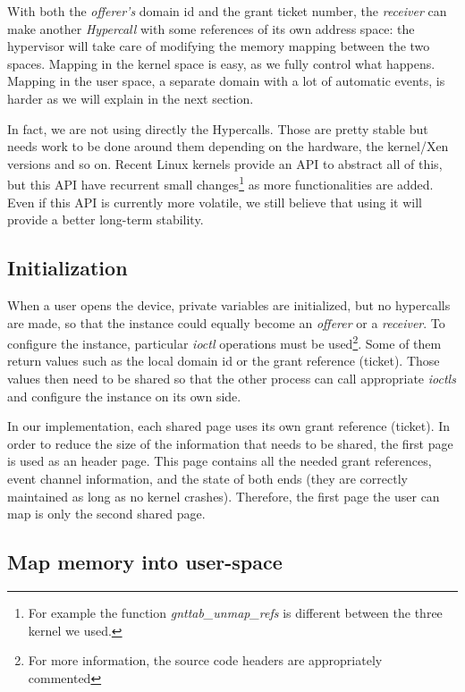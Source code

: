 \documentclass[journal]{IEEEtran}
\begin{document}
With both the \emph{offerer's} domain id and the grant ticket number, the \emph{receiver} can make another \emph{Hypercall} with some references of its own address space: the hypervisor will take care of modifying the memory mapping between the two spaces. Mapping in the kernel space is easy, as we fully control what happens. Mapping in the user space, a separate domain with a lot of automatic events, is harder as we will explain in the next section. 

In fact, we are not using directly the Hypercalls. Those are pretty stable but needs work to be done around them depending on the hardware, the kernel/Xen versions and so on. Recent Linux kernels provide an API to abstract all of this, but this API have recurrent small changes\footnote{For example the function \emph{gnttab\_unmap\_refs} is different between the three kernel we used.} as more functionalities are added. Even if this API is currently more volatile, we still believe that using it will provide a better long-term stability.

\subsection{Initialization}

When a user opens the device, private variables are initialized, but no hypercalls are made, so that the instance could equally become an \emph{offerer} or a \emph{receiver}. To configure the instance, particular \emph{ioctl} operations must be used\footnote{For more information, the source code headers are appropriately commented}. Some of them return values such as the local domain id or the grant reference (ticket). 
Those values then need to be shared so that the other process can call appropriate \emph{ioctls} and configure the instance on its own side. 

In our implementation, each shared page uses its own grant reference (ticket). In order to reduce the size of the information that needs to be shared, the first page is used as an header page. This page contains all the needed grant references, event channel information, and the state of both ends (they are correctly maintained as long as no kernel crashes). Therefore, the first page the user can map is only the second shared page. 

\subsection{Map memory into user-space}
\label{userspace}
\end{document}
